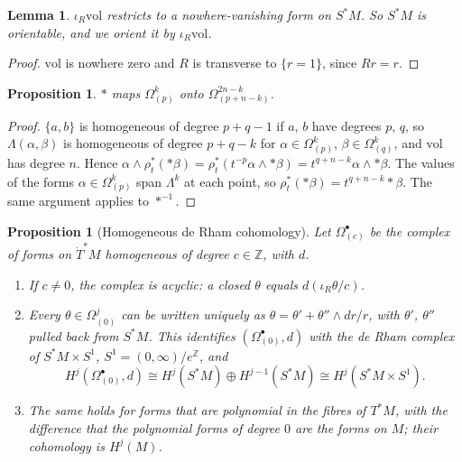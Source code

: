 \documentclass[11pt,oneside,reqno]{article}
\newcommand{\Z}{\mathbb Z}
\newcommand{\Om}{\Omega}
\newcommand{\Tdot}{\dot T^*}
\newcommand{\vol}{\mathrm{vol}}
\theoremstyle{plain}
\newtheorem{proposition}[theorem]{Proposition}
\newtheorem{lemma}[theorem]{Lemma}
\theoremstyle{definition}
\theoremstyle{remark}
\begin{document}
\begin{lemma}\label{lem:Sorient}
\(\iota_R\vol\) restricts to a nowhere-vanishing form on \(S^*M\). So \(S^*M\) is
orientable, and we orient it by \(\iota_R\vol\).
\end{lemma}

\begin{proof}
\(\vol\) is nowhere zero and \(R\) is transverse to \(\{r=1\}\), since \(Rr=r\).
\end{proof}

\begin{proposition}\label{prop:starhom}
\(*\) maps \(\Om^k_{(p)}\) onto \(\Om^{2n-k}_{(p+n-k)}\).
\end{proposition}

\begin{proof}
\(\{a,b\}\) is homogeneous of degree \(p+q-1\) if \(a\), \(b\) have degrees \(p\), \(q\), so
\(\Lambda(\alpha,\beta)\) is homogeneous of degree \(p+q-k\) for
\(\alpha\in\Om^k_{(p)}\), \(\beta\in\Om^k_{(q)}\), and \(\vol\) has degree \(n\). Hence
\(\alpha\wedge\rho_t^*(*\beta)=\rho_t^*(t^{-p}\alpha\wedge*\beta)=t^{q+n-k}\alpha\wedge*\beta\). The values
of the forms \(\alpha\in\Om^k_{(p)}\) span \(\Lambda^k\) at each point, so
\(\rho_t^*(*\beta)=t^{q+n-k}*\beta\). The same argument applies to \(*^{-1}\).
\end{proof}

\begin{proposition}[Homogeneous de Rham cohomology]\label{prop:homdR}
Let \(\Om^\bullet_{(c)}\) be the complex of forms on \(\Tdot M\) homogeneous of degree
\(c\in\Z\), with \(d\).
\begin{enumerate}
\item If \(c\ne0\), the complex is acyclic: a closed \(\theta\) equals
\(d(\iota_R\theta/c)\).
\item Every \(\theta\in\Om^j_{(0)}\) can be written uniquely as
\(\theta=\theta'+\theta''\wedge dr/r\), with \(\theta'\), \(\theta''\) pulled back from \(S^*M\). This
identifies \((\Om^\bullet_{(0)},d)\) with the de Rham complex of \(S^*M\times S^1\),
\(S^1=(0,\infty)/e^{\Z}\), and
\[
 H^j(\Om^\bullet_{(0)},d)\cong H^j(S^*M)\oplus H^{j-1}(S^*M)\cong H^j(S^*M\times S^1).
\]
\item The same holds for forms that are polynomial in the fibres of
\(T^*M\), with the difference that the polynomial forms of degree \(0\) are the
forms on \(M\); their cohomology is \(H^j(M)\).
\end{enumerate}
\end{proposition}
\end{document}
